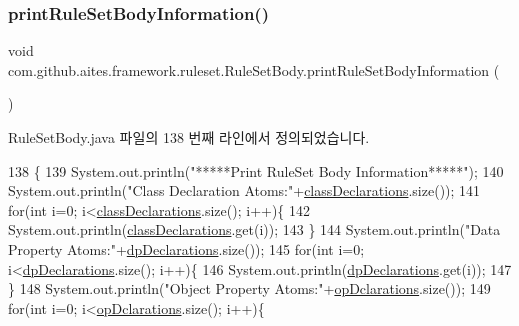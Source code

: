 \subsubsection{\texorpdfstring{print\+Rule\+Set\+Body\+Information()}{printRuleSetBodyInformation()}}
{\footnotesize\ttfamily void com.\+github.\+aites.\+framework.\+ruleset.\+Rule\+Set\+Body.\+print\+Rule\+Set\+Body\+Information (\begin{DoxyParamCaption}{ }\end{DoxyParamCaption})}



Rule\+Set\+Body.\+java 파일의 138 번째 라인에서 정의되었습니다.


\begin{DoxyCode}
138                                              \{
139         System.out.println(\textcolor{stringliteral}{"*****Print RuleSet Body Information*****"});
140         System.out.println(\textcolor{stringliteral}{"Class Declaration Atoms:"}+\mbox{\hyperlink{classcom_1_1github_1_1aites_1_1framework_1_1ruleset_1_1_rule_set_body_a01a0ea947278595b1ebd1b13a5d1c7cd}{classDeclarations}}.size());
141         \textcolor{keywordflow}{for}(\textcolor{keywordtype}{int} i=0; i<\mbox{\hyperlink{classcom_1_1github_1_1aites_1_1framework_1_1ruleset_1_1_rule_set_body_a01a0ea947278595b1ebd1b13a5d1c7cd}{classDeclarations}}.size(); i++)\{
142             System.out.println(\mbox{\hyperlink{classcom_1_1github_1_1aites_1_1framework_1_1ruleset_1_1_rule_set_body_a01a0ea947278595b1ebd1b13a5d1c7cd}{classDeclarations}}.get(i));
143         \}
144         System.out.println(\textcolor{stringliteral}{"Data Property Atoms:"}+\mbox{\hyperlink{classcom_1_1github_1_1aites_1_1framework_1_1ruleset_1_1_rule_set_body_a04dba43584689b29c9da9a357effe069}{dpDeclarations}}.size());
145         \textcolor{keywordflow}{for}(\textcolor{keywordtype}{int} i=0; i<\mbox{\hyperlink{classcom_1_1github_1_1aites_1_1framework_1_1ruleset_1_1_rule_set_body_a04dba43584689b29c9da9a357effe069}{dpDeclarations}}.size(); i++)\{
146             System.out.println(\mbox{\hyperlink{classcom_1_1github_1_1aites_1_1framework_1_1ruleset_1_1_rule_set_body_a04dba43584689b29c9da9a357effe069}{dpDeclarations}}.get(i));
147         \}
148         System.out.println(\textcolor{stringliteral}{"Object Property Atoms:"}+\mbox{\hyperlink{classcom_1_1github_1_1aites_1_1framework_1_1ruleset_1_1_rule_set_body_af528c6344f8e8c5b070a93bf12c440b4}{opDclarations}}.size());
149         \textcolor{keywordflow}{for}(\textcolor{keywordtype}{int} i=0; i<\mbox{\hyperlink{classcom_1_1github_1_1aites_1_1framework_1_1ruleset_1_1_rule_set_body_af528c6344f8e8c5b070a93bf12c440b4}{opDclarations}}.size(); i++)\{

\end{DoxyCode}
